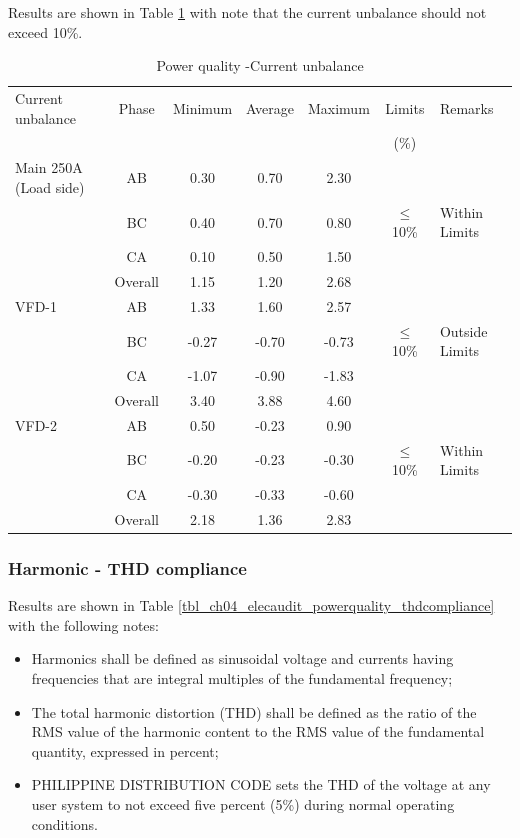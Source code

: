 Results are shown in Table \ref{tbl_ch04_elecaudit_powerquality_currentunbalance} with note that the current unbalance should not exceed 10\%.


\begin{table}[!htb]
	\caption{Power quality -Current unbalance}
	\label{tbl_ch04_elecaudit_powerquality_currentunbalance}
	{\scriptsize
		
\begin{tabular}{l|c|c|c|c|c|l}
	\hline
	Current unbalance & Phase & Minimum & Average & Maximum & Limits & Remarks \\ 
	&  &  &  &  & (\%) &  \\ 
	\hline
	Main 250A (Load side) & AB & 0.30 & 0.70 & 2.30 &  &  \\ 
	& BC & 0.40 & 0.70 & 0.80 & $\leq$ 10\% & Within  Limits \\ 
	& CA & 0.10 & 0.50 & 1.50 &  &  \\ 
	& Overall & 1.15 & 1.20 & 2.68 &  &  \\ 
	\hline
	VFD-1 & AB & 1.33 & 1.60 & 2.57 &  &  \\ 
	& BC & -0.27 & -0.70 & -0.73 & $\leq$ 10\% & Outside  Limits \\ 
	& CA & -1.07 & -0.90 & -1.83 &  &  \\ 
	& Overall & 3.40 & 3.88 & 4.60 &  &  \\ 
	\hline
	VFD-2 & AB & 0.50 & -0.23 & 0.90 &  &  \\ 
	& BC & -0.20 & -0.23 & -0.30 & $\leq$ 10\% & Within Limits \\ 
	& CA & -0.30 & -0.33 & -0.60 &  &  \\ 
	& Overall & 2.18 & 1.36 & 2.83 &  &  \\ 
	\hline
\end{tabular}

		
	}%
\end{table}


\subsubsection{Harmonic - THD compliance}

Results are shown in Table \ref{tbl_ch04_elecaudit_powerquality_thdcompliance} with the following notes:

\begin{itemize}
\item Harmonics shall be defined as sinusoidal voltage and currents having frequencies that are integral multiples of the fundamental frequency;

\item The total harmonic distortion (THD) shall be defined as the ratio of the RMS value of the harmonic content to the RMS value of the fundamental quantity, expressed in percent;

\item PHILIPPINE DISTRIBUTION CODE sets the THD of the voltage at any user 		system to not exceed five percent (5\%) during normal operating conditions. 
\end{itemize}





